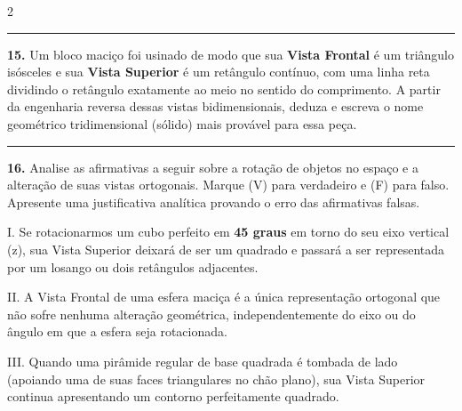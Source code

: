 \documentclass[twoside, 10pt, a4paper]{article}
\begin{document}
\begin{multicols*}{2}
\noindent\textcolor{CorLinha}{\rule{\linewidth}{0.5pt}} 
\par\par\vspace{0.5cm}
\textbf{15.} Um bloco maciço foi usinado de modo que sua \textbf{Vista Frontal} é um triângulo isósceles e sua \textbf{Vista Superior} é um retângulo contínuo, com uma linha reta dividindo o retângulo exatamente ao meio no sentido do comprimento. A partir da engenharia reversa dessas vistas bidimensionais, deduza e escreva o nome geométrico tridimensional (sólido) mais provável para essa peça.
\par\vspace{0.5cm}

\noindent\textcolor{CorLinha}{\rule{\linewidth}{0.5pt}} 
\par\par\vspace{0.5cm}
\textbf{16.} Analise as afirmativas a seguir sobre a rotação de objetos no espaço e a alteração de suas vistas ortogonais. Marque (V) para verdadeiro e (F) para falso. Apresente uma justificativa analítica provando o erro das afirmativas falsas.

I. Se rotacionarmos um cubo perfeito em \textbf{45 graus} em torno do seu eixo vertical (z), sua Vista Superior deixará de ser um quadrado e passará a ser representada por um losango ou dois retângulos adjacentes.\par\par\vspace{0.5cm}
II. A Vista Frontal de uma esfera maciça é a única representação ortogonal que não sofre nenhuma alteração geométrica, independentemente do eixo ou do ângulo em que a esfera seja rotacionada.\par\par\vspace{0.5cm}
III. Quando uma pirâmide regular de base quadrada é tombada de lado (apoiando uma de suas faces triangulares no chão plano), sua Vista Superior continua apresentando um contorno perfeitamente quadrado.
\par\vspace{0.5cm}


\end{multicols*}
\end{document}
